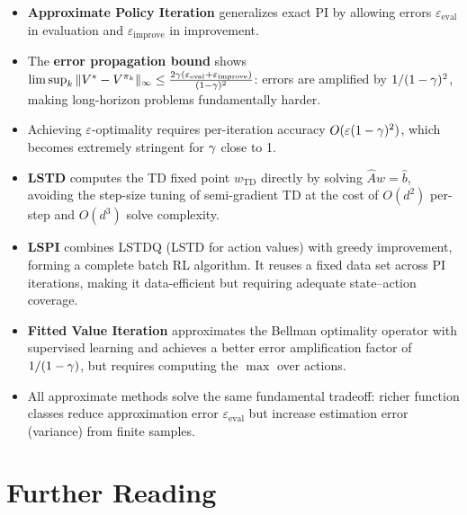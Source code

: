 \documentclass[11pt,a4paper]{article}
\begin{document}
\begin{itemize}
  \item \textbf{Approximate Policy Iteration} generalizes exact PI by
    allowing errors $\varepsilon_{\mathrm{eval}}$ in evaluation and
    $\varepsilon_{\mathrm{improve}}$ in improvement.

  \item The \textbf{error propagation bound} shows
    $\limsup_k \|V^* - V^{\pi_k}\|_\infty
    \leq \frac{2\gamma(\varepsilon_{\mathrm{eval}}
    + \varepsilon_{\mathrm{improve}})}{(1-\gamma)^2}$:
    errors are amplified by $1/(1-\gamma)^2$, making
    long-horizon problems fundamentally harder.

  \item Achieving $\varepsilon$-optimality requires per-iteration
    accuracy $O(\varepsilon(1-\gamma)^2)$, which becomes
    extremely stringent for $\gamma$ close to 1.

  \item \textbf{LSTD} computes the TD fixed point $w_{\mathrm{TD}}$
    directly by solving $\hat{A}w = \hat{b}$, avoiding the step-size
    tuning of semi-gradient TD at the cost of $O(d^2)$ per-step and
    $O(d^3)$ solve complexity.

  \item \textbf{LSPI} combines LSTDQ (LSTD for action values) with
    greedy improvement, forming a complete batch RL algorithm.
    It reuses a fixed data set across PI iterations, making it
    data-efficient but requiring adequate state--action coverage.

  \item \textbf{Fitted Value Iteration} approximates the Bellman
    optimality operator with supervised learning and achieves a
    better error amplification factor of $1/(1-\gamma)$, but
    requires computing the $\max$ over actions.

  \item All approximate methods solve the same fundamental tradeoff:
    richer function classes reduce approximation error
    $\varepsilon_{\mathrm{eval}}$ but increase estimation error
    (variance) from finite samples.
\end{itemize}

\section{Further Reading}
\label{sec:further_reading}
\end{document}
